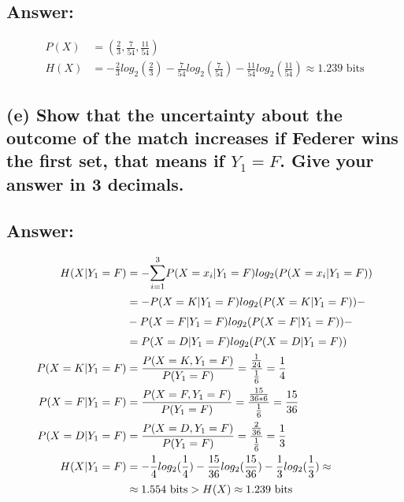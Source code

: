 \documentclass[11px]{article}
\begin{document}
\subsection*{Answer: }

\begin{equation}
\begin{split}
P(X) & = (\frac{2}{3},\frac{7}{54},\frac{11}{54}) \\
H(X) & = -\frac{2}{3}log_2(\frac{2}{3}) - \frac{7}{54}log_2(\frac{7}{54}) - \frac{11}{54}log_2(\frac{11}{54}) \approx 1.239 \text{ bits}
\end{split}
\end{equation}

\subsection*{\normalfont (e) Show that the uncertainty about the outcome of the match increases if Federer wins the first set, that means if \(Y_1 = F\). Give your answer in 3 decimals.}

\subsection*{Answer: }

\begin{equation}
\begin{split}
H(X|Y_1 = F) & = -\mathlarger{\sum}_{i=1}^{3}P(X = x_i|Y_1 = F)log_2(P(X = x_i|Y_1 = F)) \\ 
& = -P(X = K|Y_1 = F)log_2(P(X = K|Y_1 = F)) - \\
& - P(X = F|Y_1 = F)log_2(P(X = F|Y_1 = F)) - \\ 
& = P(X = D|Y_1 = F)log_2(P(X = D|Y_1 = F)) \\
P(X = K|Y_1 = F) & = \frac{P(X = K,Y_1 = F)}{P(Y_1 = F)} = \frac{\frac{1}{24}}{\frac{1}{6}} = \frac{1}{4}\\
P(X = F|Y_1 = F) & = \frac{P(X = F,Y_1 = F)}{P(Y_1 = F)} = \frac{\frac{15}{36*6}}{\frac{1}{6}} = \frac{15}{36}\\
P(X = D|Y_1 = F) & = \frac{P(X = D,Y_1 = F)}{P(Y_1 = F)} = \frac{\frac{2}{36}}{\frac{1}{6}} = \frac{1}{3}\\
H(X|Y_1 = F) & = -\frac{1}{4}log_2(\frac{1}{4}) - \frac{15}{36}log_2(\frac{15}{36}) - \frac{1}{3}log_2(\frac{1}{3}) \approx \\ 
& \approx 1.554 \text{ bits} > H(X) \approx 1.239 \text{ bits}
\end{split}
\end{equation}
\end{document}
